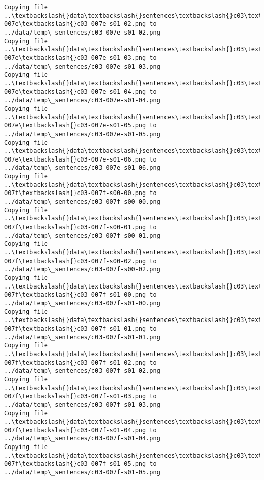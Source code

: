 \documentclass[11pt]{article}
\begin{document}
\begin{Verbatim}[commandchars=\\\{\}]
Copying file ..\textbackslash{}data\textbackslash{}sentences\textbackslash{}c03\textbackslash{}c03-007e\textbackslash{}c03-007e-s01-02.png to
../data/temp\_sentences/c03-007e-s01-02.png
Copying file ..\textbackslash{}data\textbackslash{}sentences\textbackslash{}c03\textbackslash{}c03-007e\textbackslash{}c03-007e-s01-03.png to
../data/temp\_sentences/c03-007e-s01-03.png
Copying file ..\textbackslash{}data\textbackslash{}sentences\textbackslash{}c03\textbackslash{}c03-007e\textbackslash{}c03-007e-s01-04.png to
../data/temp\_sentences/c03-007e-s01-04.png
Copying file ..\textbackslash{}data\textbackslash{}sentences\textbackslash{}c03\textbackslash{}c03-007e\textbackslash{}c03-007e-s01-05.png to
../data/temp\_sentences/c03-007e-s01-05.png
Copying file ..\textbackslash{}data\textbackslash{}sentences\textbackslash{}c03\textbackslash{}c03-007e\textbackslash{}c03-007e-s01-06.png to
../data/temp\_sentences/c03-007e-s01-06.png
Copying file ..\textbackslash{}data\textbackslash{}sentences\textbackslash{}c03\textbackslash{}c03-007f\textbackslash{}c03-007f-s00-00.png to
../data/temp\_sentences/c03-007f-s00-00.png
Copying file ..\textbackslash{}data\textbackslash{}sentences\textbackslash{}c03\textbackslash{}c03-007f\textbackslash{}c03-007f-s00-01.png to
../data/temp\_sentences/c03-007f-s00-01.png
Copying file ..\textbackslash{}data\textbackslash{}sentences\textbackslash{}c03\textbackslash{}c03-007f\textbackslash{}c03-007f-s00-02.png to
../data/temp\_sentences/c03-007f-s00-02.png
Copying file ..\textbackslash{}data\textbackslash{}sentences\textbackslash{}c03\textbackslash{}c03-007f\textbackslash{}c03-007f-s01-00.png to
../data/temp\_sentences/c03-007f-s01-00.png
Copying file ..\textbackslash{}data\textbackslash{}sentences\textbackslash{}c03\textbackslash{}c03-007f\textbackslash{}c03-007f-s01-01.png to
../data/temp\_sentences/c03-007f-s01-01.png
Copying file ..\textbackslash{}data\textbackslash{}sentences\textbackslash{}c03\textbackslash{}c03-007f\textbackslash{}c03-007f-s01-02.png to
../data/temp\_sentences/c03-007f-s01-02.png
Copying file ..\textbackslash{}data\textbackslash{}sentences\textbackslash{}c03\textbackslash{}c03-007f\textbackslash{}c03-007f-s01-03.png to
../data/temp\_sentences/c03-007f-s01-03.png
Copying file ..\textbackslash{}data\textbackslash{}sentences\textbackslash{}c03\textbackslash{}c03-007f\textbackslash{}c03-007f-s01-04.png to
../data/temp\_sentences/c03-007f-s01-04.png
Copying file ..\textbackslash{}data\textbackslash{}sentences\textbackslash{}c03\textbackslash{}c03-007f\textbackslash{}c03-007f-s01-05.png to
../data/temp\_sentences/c03-007f-s01-05.png

\end{Verbatim}
\end{document}
